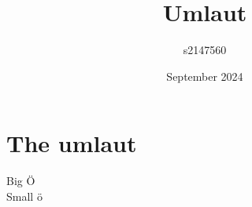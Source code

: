 \documentclass{article}
\title{Umlaut}
\author{s2147560 }
\date{September 2024}
\begin{document}
\maketitle

\section{The umlaut}
Big \"O\\
Small \"o
\end{document}
